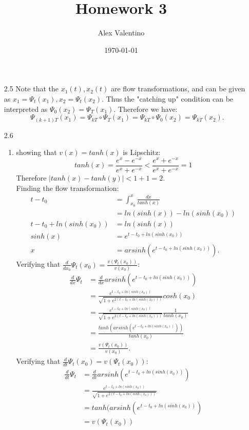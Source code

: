 \documentclass[12pt, letterpaper]{article}
\date{\today}
\author{Alex Valentino}
\title{Homework 3}
\begin{document}
\begin{enumerate}
	\item[2.5] 
		Note that the $x_1(t), x_2(t)$ are flow transformations, and can be given as $x_1 = \Psi_t (x_1), x_2 = \Psi_t (x_2)$.  Thus the "catching up" condition can be interpreted as $\Psi_0(x_2) = \Psi_T (x_1)$.  Therefore we have:
		$$
			\Psi_{(k+1)T} (x_1) = \Psi_{kT} \circ \Psi_T (x_1) = \Psi_{kT} \circ \Psi_0(x_2) = \Psi_{kT}(x_2).		
		$$  
	\item[2.6]
		\begin{enumerate}
			\item showing that $v(x) = tanh(x)$ is Lipschitz:
			$$
			tanh(x) = \frac{e^x - e^{-x}}{e^x+e^{-x}} < \frac{e^x + e^{-x}}{e^x+e^{-x}}	= 1		
			$$
			Therefore $|tanh(x) - tanh(y)| < 1 + 1 = 2$.  \\
			Finding the flow transformation:
			\begin{align*}
				t - t_0 &= \int_{x_0}^x \frac{dx}{tanh(x)}\\
				&= ln(sinh(x)) - ln(sinh(x_0))\\
				t- t_0 + ln(sinh(x_0)) &= ln(sinh(x))\\
				sinh(x) &= e^{t- t_0 + ln(sinh(x_0))}\\
				x &= arsinh(e^{t- t_0 + ln(sinh(x_0))}).
			\end{align*}
			Verifying that $\frac{d}{dx_0}\Psi_t (x_0) = \frac{v(\Psi_t (x_0))}{v(x_0)}$:
			\begin{align*}
			\frac{d}{dx}\Psi_t &= \frac{d}{dx}arsinh(e^{t- t_0 + ln(sinh(x_0))})\\
			&=  \frac{e^{t- t_0 + ln(sinh(x_0))}}{\sqrt{1 + e^{2(t- t_0 + ln(sinh(x_0)))}}}cosh(x_0)\\
			&= \frac{e^{t- t_0 + ln(sinh(x_0))}}{\sqrt{1 + e^{2(t- t_0 + ln(sinh(x_0)))}}}\frac{1}{tanh(x_0)}\\
			&= \frac{tanh(arsinh(e^{t- t_0 + ln(sinh(x_0))}))}{tanh(x_0)}\\
			&= \frac{v(\Psi_t(x_0))}{v(x_0)}.
			\end{align*}
			Verifying that $\frac{d}{dt} \Psi_t (x_0) = v(\Psi_t (x_0))$:
			\begin{align*}
				\frac{d}{dt} \Psi_t &= \frac{d}{dt}arsinh(e^{t- t_0 + ln(sinh(x_0))})\\
				&= \frac{e^{t- t_0 + ln(sinh(x_0))}}{\sqrt{1 + e^{2(t- t_0 + ln(sinh(x_0)))}}} \\
				&= tanh(arsinh(e^{t-t_0 + ln(sinh(x_0))})\\
				&= v(\Psi_t(x_0))
			\end{align*}

\end{enumerate}
\end{enumerate}
\end{document}
